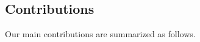 \documentclass[10pt,journal,twoside]{IEEEtran}
\theoremstyle{definition}
\theoremstyle{remark}
\begin{document}



\subsection{Contributions}


Our main contributions are summarized as follows.
\end{document}
